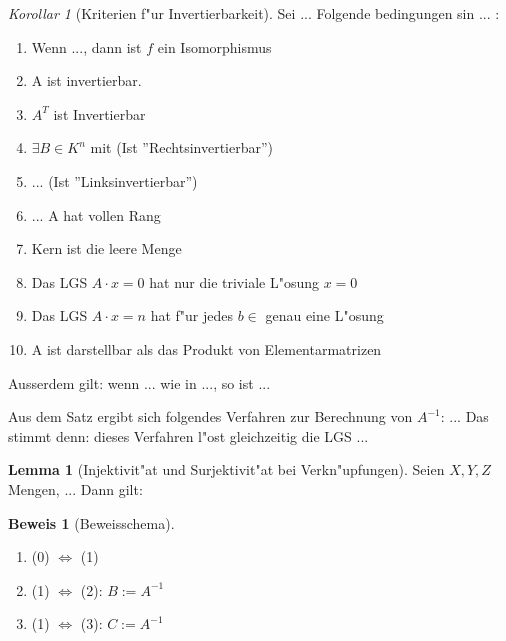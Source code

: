 \documentclass[11pt]{article}
\theoremstyle{remark}
\theoremstyle{definition}
\newtheorem{prof}{Beweis}
\newtheorem*{lemma}{Lemma}
\theoremstyle{remark}
\newtheorem*{korollar}{Korollar}
\begin{document}
\begin{korollar}[Kriterien f"ur Invertierbarkeit]
  Sei ... Folgende bedingungen sin ... :
  \begin{enumerate}
  \item Wenn ..., dann ist $f$ ein Isomorphismus
  \item A ist invertierbar.
  \item $A^T$ ist Invertierbar
  \item $\exists B\in K^n$ mit (Ist ''Rechtsinvertierbar'')
  \item ... (Ist ''Linksinvertierbar'')
  \item ... A hat vollen Rang
  \item Kern ist die leere Menge
  \item Das LGS $A\cdot x = 0$ hat nur die triviale L"osung $x=0$
  \item Das LGS $A\cdot x = n$ hat f"ur jedes $b\in $ genau eine L"osung
  \item A ist darstellbar als das Produkt von Elementarmatrizen
  \end{enumerate}

  Ausserdem gilt: wenn ... wie in ..., so ist ... 
\end{korollar}

Aus dem Satz ergibt sich folgendes Verfahren zur Berechnung von $A^{-1}$: ...
Das stimmt denn: dieses Verfahren l"ost gleichzeitig die LGS ...

\begin{lemma}[Injektivit"at und Surjektivit"at bei Verkn"upfungen]
  Seien $X,Y,Z$ Mengen, ... Dann gilt:  
\end{lemma}

\begin{prof}[Beweisschema]
  \begin{enumerate}
  \item (0) $ \iff $ (1)
  \item (1) $ \iff $ (2): $B:=A^{-1}$
  \item (1) $ \iff $ (3): $C:=A^{-1}$
  \end{enumerate}
\end{prof}
\end{document}
